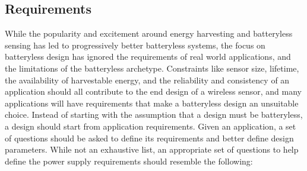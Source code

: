 
\subsection{Requirements}
While the popularity and excitement around energy harvesting and batteryless sensing has led to progressively better batteryless systems, the focus on batteryless design has ignored the requirements of real world applications, and the limitations of the batteryless archetype.
Constraints like sensor size, lifetime, the availability of harvestable energy, and the reliability and consistency of an application should all contribute to the end design of a wireless sensor, and many applications will have requirements that make a batteryless design an unsuitable choice.
Instead of starting with the assumption that a design must be batteryless, a design should start from application requirements. Given an application, a set of questions should be asked to define its requirements and better define design parameters.
While not an exhaustive list, an appropriate set of questions to help define the power supply requirements should resemble the following:
    
